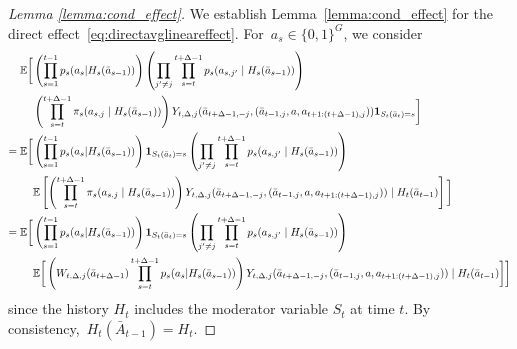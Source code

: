 \documentclass[supplementary, lineno]{biometrika}
\def\E{\mathbb{E}}
\begin{document}
\begin{proof}[Lemma \ref{lemma:cond_effect}]
We establish Lemma~\ref{lemma:cond_effect} for the direct effect~\eqref{eq:directavglineareffect}. For~$a_s \in \{ 0,1\}^{G}$, we consider
\begin{align*}
\E \bigg[&\left(\prod_{s=1}^{t-1} p_s(a_s |H_s(\bar a_{s-1})) \right) \left( \prod_{j^\prime \neq j} \prod_{s=t}^{t+\Delta-1} p_s(a_{s,j^\prime} \mid H_s(\bar a_{s-1})) \right)  \\
&\left( \prod_{s=t}^{t+\Delta-1} \pi_s(a_{s,j} \mid H_s(\bar a_{s-1})) \right) 
 Y_{t,\Delta,j} (\bar{a}_{t+\Delta-1,-j}, (\bar a_{t-1,j},a, a_{t+1:(t+\Delta-1), j})) {\bf 1}_{S_t(\bar a_t) = s} \bigg] \\
= \E \bigg[&\left(\prod_{s=1}^{t-1} p_s(a_s |H_s(\bar a_{s-1})) \right) {\bf 1}_{S_t(\bar a_t) = s} \left( \prod_{j^\prime \neq j} \prod_{s=t}^{t+\Delta-1} p_s(a_{s,j^\prime} \mid H_s(\bar a_{s-1})) \right)  \\
&\E \left[ \left( \prod_{s=t}^{t+\Delta-1} \pi_s(a_{s,j} \mid H_s(\bar a_{s-1})) \right) Y_{t,\Delta,j} (\bar{a}_{t+\Delta-1,-j}, (\bar a_{t-1,j},a, a_{t+1:(t+\Delta-1), j})) \mid H_t (\bar a_{t-1}) \right] \bigg] \\
= \E \bigg[&\left(\prod_{s=1}^{t-1} p_s(a_s |H_s(\bar a_{s-1})) \right) {\bf 1}_{S_t(\bar a_t) = s} \left( \prod_{j^\prime \neq j} \prod_{s=t}^{t+\Delta-1} p_s(a_{s,j^\prime} \mid H_s(\bar a_{s-1})) \right)  \\
&\E \bigg[ \left( W_{t,\Delta, j} (\bar a_{t+\Delta-1}) \prod_{s=t}^{t+\Delta-1} p_s(a_s |H_s(\bar a_{s-1})) \right) Y_{t,\Delta,j} (\bar{a}_{t+\Delta-1,-j}, (\bar a_{t-1,j},a, a_{t+1:(t+\Delta-1), j})) \mid H_t (\bar a_{t-1}) \bigg] \bigg] \\
\end{align*}
since the history $H_t$ includes the moderator variable $S_t$ at time $t$. By consistency,~$H_t(\bar{A}_{t-1}) = H_t$.

\end{proof}
\end{document}
